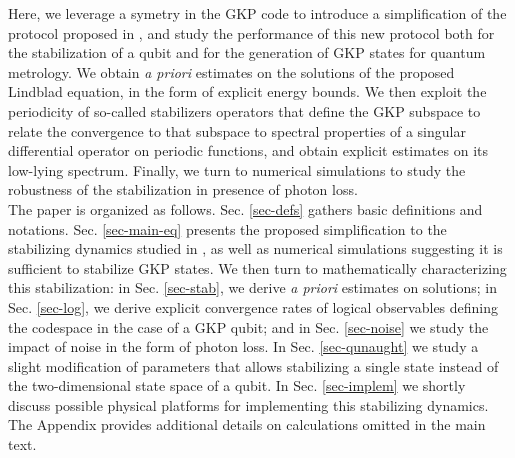 \documentclass[a4paper, 11pt]{article}
\begin{document}
Here, we leverage a symetry in the GKP code to introduce a simplification of the protocol proposed in \cite{sellemDissipativeProtectionGKP2025}, and study the performance of this new protocol both for the stabilization of a qubit and for the generation of GKP states for quantum metrology.
We obtain \emph{a priori} estimates on the solutions of the proposed Lindblad equation, in the form of explicit energy bounds. We then exploit the periodicity of so-called stabilizers operators that define the GKP subspace to relate the convergence to that subspace to spectral properties of a singular differential operator on periodic functions, and obtain explicit estimates on its low-lying spectrum.
Finally, we turn to numerical simulations to study the robustness of the stabilization in presence of photon loss.
\\

The paper is organized as follows. Sec. \ref{sec-defs} gathers basic definitions and notations.
Sec. \ref{sec-main-eq} presents the proposed simplification to the stabilizing dynamics studied in \cite{sellemDissipativeProtectionGKP2025},
as well as numerical simulations suggesting it is sufficient to stabilize GKP states. We then turn  to mathematically characterizing this stabilization: in Sec. \ref{sec-stab}, we derive \emph{a priori} estimates on solutions; in  Sec. \ref{sec-log}, we derive explicit convergence rates of logical observables defining the codespace in the case of a GKP qubit; and in Sec. \ref{sec-noise} we study the impact of noise in the form of photon loss.
In Sec. \ref{sec-qunaught} we study a slight modification of parameters that allows stabilizing a single state instead of the two-dimensional state space of a qubit.
In Sec. \ref{sec-implem} we shortly discuss possible physical platforms for implementing this stabilizing dynamics.
The Appendix  provides additional details on calculations omitted in the main text.
\end{document}

